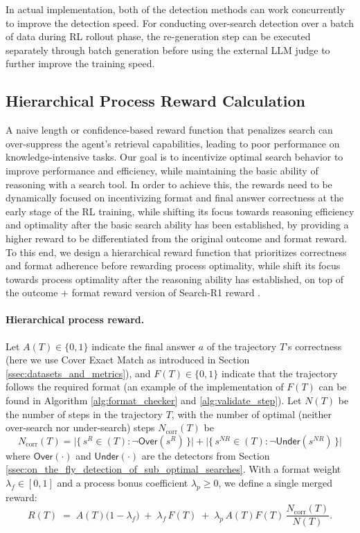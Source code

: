 \documentclass{article}
\begin{document}
In actual implementation, both of the detection methods can work concurrently to improve the detection speed. For conducting over-search detection over a batch of data during RL rollout phase, the re-generation step can be executed separately through batch generation before using the external LLM judge to further improve the training speed.


\subsection{Hierarchical Process Reward Calculation}
\label{ssec:hierarchical_process_reward_calculation}
A naive length or confidence-based reward function that penalizes search can over-suppress the agent's retrieval capabilities, leading to poor performance on knowledge-intensive tasks. Our goal is to incentivize optimal search behavior to improve performance and efficiency, while maintaining the basic ability of reasoning with a search tool. In order to achieve this, the rewards need to be dynamically focused on incentivizing format and final answer correctness at the early stage of the RL training, while shifting its focus towards reasoning efficiency and optimality after the basic search ability has been established, by providing a higher reward to be differentiated from the original outcome and format reward. To this end, we design a hierarchical reward function that prioritizes correctness and format adherence before rewarding process optimality, while shift its focus towards process optimality after the reasoning ability has established, on top of the outcome + format reward version of Search-R1 reward .

\paragraph{Hierarchical process reward.}
Let $A(T)\in\{0,1\}$ indicate the final answer $a$ of the trajectory $T$'s correctness (here we use Cover Exact Match as introduced in Section \ref{ssec:datasets_and_metrics}), and $F(T)\in\{0,1\}$ indicate that the trajectory follows the required format (an example of the implementation of $F(T)$ can be found in Algorithm \ref{alg:format_checker} and \ref{alg:validate_step}). Let $N(T)$ be the number of steps in the trajectory $T$, with the number of optimal (neither over-search nor under-search) steps $N_{\text{corr}}(T)$ be
\[
N_{\text{corr}}(T)=\bigl|\{\,s^R\in(T): \neg\textsf{Over}(s^R)\,\}\bigr|\! + \bigl|\{\,s^{NR}\in(T): \neg\textsf{Under}(s^{NR})\,\}\bigr|\!
\]
where $\textsf{Over}(\cdot)$ and $\textsf{Under}(\cdot)$ are the detectors from Section \ref{ssec:on_the_fly_detection_of_sub_optimal_searches}. With a format weight $\lambda_f\!\in[0,1]$ and a process bonus coefficient $\lambda_p\!\ge0$, we define a single merged reward:
\begin{equation}
\label{eq:hier-proc-reward}
R(T)
\;=\;
A(T)\bigl(1-\lambda_f\bigr)
\;+\;
\lambda_f\,F(T)
\;+\;
\lambda_p\,A(T)F(T)\,
\frac{N_{\text{corr}}(T)}{N(T)}.
\end{equation}
\end{document}
